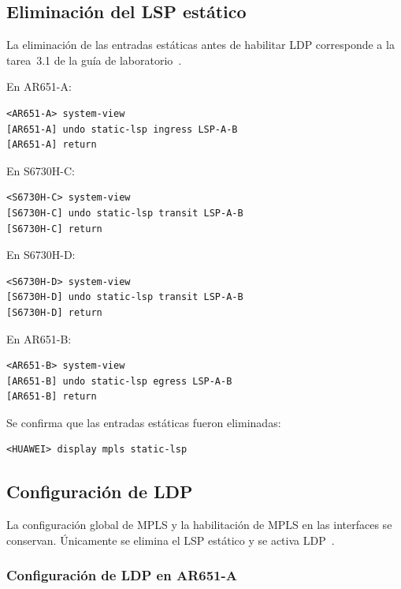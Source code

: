 \subsection{Eliminación del LSP estático}

La eliminación de las entradas estáticas antes de habilitar LDP corresponde
a la tarea~3.1 de la guía de laboratorio~\cite[tarea~3.1]{guia-mpls-ar651-s6730h}.

En AR651-A:

\begin{lstlisting}[style=terminal]
<AR651-A> system-view
[AR651-A] undo static-lsp ingress LSP-A-B
[AR651-A] return
\end{lstlisting}

En S6730H-C:

\begin{lstlisting}[style=terminal]
<S6730H-C> system-view
[S6730H-C] undo static-lsp transit LSP-A-B
[S6730H-C] return
\end{lstlisting}

En S6730H-D:

\begin{lstlisting}[style=terminal]
<S6730H-D> system-view
[S6730H-D] undo static-lsp transit LSP-A-B
[S6730H-D] return
\end{lstlisting}

En AR651-B:

\begin{lstlisting}[style=terminal]
<AR651-B> system-view
[AR651-B] undo static-lsp egress LSP-A-B
[AR651-B] return
\end{lstlisting}

Se confirma que las entradas estáticas fueron eliminadas:

\begin{lstlisting}[style=terminal]
<HUAWEI> display mpls static-lsp
\end{lstlisting}

\subsection{Configuración de LDP}

La configuración global de MPLS y la habilitación de MPLS en las interfaces
se conservan. Únicamente se elimina el LSP estático y se activa LDP~\cite[tareas~3.1--3.2]{guia-mpls-ar651-s6730h}.

\subsubsection{Configuración de LDP en AR651-A}

